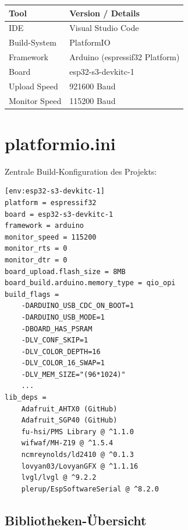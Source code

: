 \documentclass[a4paper,11pt]{article}
\begin{document}
\begin{longtable}{p{4cm} p{9cm}}
\toprule
\rowcolor{tableheader}
\textbf{Tool} & \textbf{Version / Details} \\
\midrule
\endhead
IDE            & Visual Studio Code \\
Build-System   & PlatformIO \\
Framework      & Arduino (espressif32 Platform) \\
Board          & esp32-s3-devkitc-1 \\
Upload Speed   & 921600 Baud \\
Monitor Speed  & 115200 Baud \\
\bottomrule
\end{longtable}

\section{platformio.ini}

Zentrale Build-Konfiguration des Projekts:

\begin{lstlisting}
[env:esp32-s3-devkitc-1]
platform = espressif32
board = esp32-s3-devkitc-1
framework = arduino
monitor_speed = 115200
monitor_rts = 0
monitor_dtr = 0
board_upload.flash_size = 8MB
board_build.arduino.memory_type = qio_opi
build_flags =
    -DARDUINO_USB_CDC_ON_BOOT=1
    -DARDUINO_USB_MODE=1
    -DBOARD_HAS_PSRAM
    -DLV_CONF_SKIP=1
    -DLV_COLOR_DEPTH=16
    -DLV_COLOR_16_SWAP=1
    -DLV_MEM_SIZE="(96*1024)"
    ...
lib_deps =
    Adafruit_AHTX0 (GitHub)
    Adafruit_SGP40 (GitHub)
    fu-hsi/PMS Library @ ^1.1.0
    wifwaf/MH-Z19 @ ^1.5.4
    ncmreynolds/ld2410 @ ^0.1.3
    lovyan03/LovyanGFX @ ^1.1.16
    lvgl/lvgl @ ^9.2.2
    plerup/EspSoftwareSerial @ ^8.2.0
\end{lstlisting}

\subsection{Bibliotheken-Übersicht}
\end{document}
